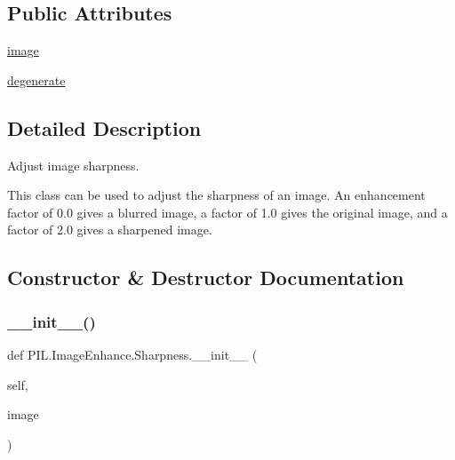 \subsection*{Public Attributes}
\begin{DoxyCompactItemize}
\item 
\hyperlink{classPIL_1_1ImageEnhance_1_1Sharpness_a965383939457465ea5f4b181647fa366}{image}
\item 
\hyperlink{classPIL_1_1ImageEnhance_1_1Sharpness_aca8023d57dff8fa21ee23853109e4e3f}{degenerate}
\end{DoxyCompactItemize}


\subsection{Detailed Description}
\begin{DoxyVerb}Adjust image sharpness.

This class can be used to adjust the sharpness of an image. An
enhancement factor of 0.0 gives a blurred image, a factor of 1.0 gives the
original image, and a factor of 2.0 gives a sharpened image.
\end{DoxyVerb}
 

\subsection{Constructor \& Destructor Documentation}
\mbox{\label{classPIL_1_1ImageEnhance_1_1Sharpness_a6398e3a4bb67d448971d10dfbf8ad01b}} 
\subsubsection{\texorpdfstring{\+\_\+\+\_\+init\+\_\+\+\_\+()}{\_\_init\_\_()}}
{\footnotesize\ttfamily def P\+I\+L.\+Image\+Enhance.\+Sharpness.\+\_\+\+\_\+init\+\_\+\+\_\+ (\begin{DoxyParamCaption}\item[{}]{self,  }\item[{}]{image }\end{DoxyParamCaption})}



